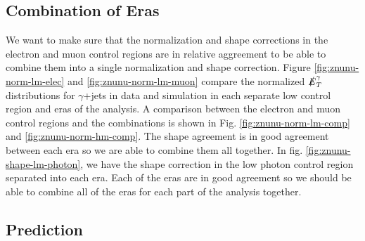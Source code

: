 
\subsection{Combination of Eras}\label{subsec:znunucombine}

We want to make sure that the normalization and shape corrections in the electron and muon control regions are in relative aggreement to be able to combine them into a single normalization and shape correction. Figure \ref{fig:znunu-norm-lm-elec} and \ref{fig:znunu-norm-lm-muon} compare the normalized $\slashed{E}_{T}^\gamma$ distributions for $\gamma$+jets in data and simulation in each separate low \dm{} control region and eras of the analysis. A comparison between the electron and muon control regions and the combinations is shown in Fig. \ref{fig:znunu-norm-lm-comp} and \ref{fig:znunu-norm-hm-comp}. The shape agreement is in good agreement between each era so we are able to combine them all together. In fig. \ref{fig:znunu-shape-lm-photon}, we have the shape correction in the low \dm{} photon control region separated into each era. Each of the eras are in good agreement so we should be able to combine all of the eras for each part of the analysis together.




\subsection{Prediction}\label{subsec:znunuprediction}

